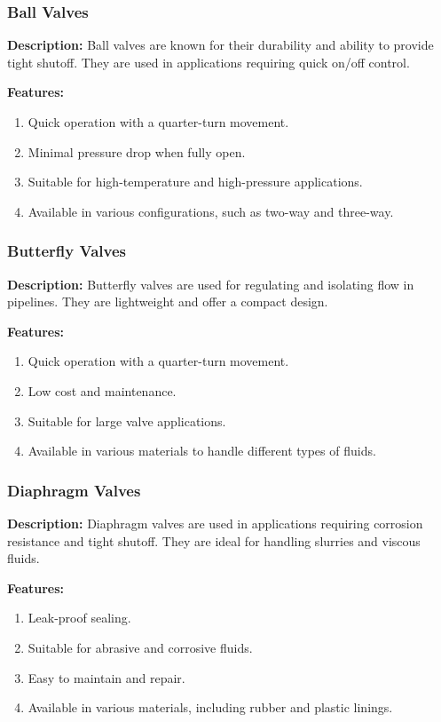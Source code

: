 \subsubsection{Ball Valves}

\textbf{Description:} Ball valves are known for their durability and ability to provide tight shutoff. They are used in applications requiring quick on/off control.

\textbf{Features:}
\begin{enumerate}
    \item Quick operation with a quarter-turn movement.
    \item Minimal pressure drop when fully open.
    \item Suitable for high-temperature and high-pressure applications.
    \item Available in various configurations, such as two-way and three-way.
\end{enumerate}
\subsubsection{Butterfly Valves}

\textbf{Description:} Butterfly valves are used for regulating and isolating flow in pipelines. They are lightweight and offer a compact design.

\textbf{Features:}
\begin{enumerate}
    \item Quick operation with a quarter-turn movement.
    \item Low cost and maintenance.
    \item Suitable for large valve applications.
    \item Available in various materials to handle different types of fluids.
\end{enumerate}

\subsubsection{Diaphragm Valves}

\textbf{Description:} Diaphragm valves are used in applications requiring corrosion resistance and tight shutoff. They are ideal for handling slurries and viscous fluids.

\textbf{Features:}
\begin{enumerate}
    \item Leak-proof sealing.
    \item Suitable for abrasive and corrosive fluids.
    \item Easy to maintain and repair.
    \item Available in various materials, including rubber and plastic linings.
\end{enumerate}
